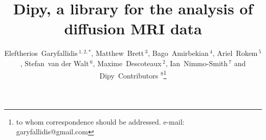 \documentclass{bioinfo}
\begin{document}

\title[DIPY]{Dipy, a library for the analysis of diffusion MRI data}

\author[Garyfallidis, Brett, Amirbekian, Rokem, van der Walt, Descoteaux,
  Nimmo-Smith]{Eleftherios~Garyfallidis\,$^{1,2,*}$, Matthew~Brett\,$^{3}$,
  Bago~Amirbekian\,$^{4}$, Ariel~Rokem\,$^{5}$, Stefan~van der Walt\,$^{6}$,
  Maxime~Descoteaux\,$^{2}$, Ian~Nimmo-Smith\,$^{7}$ and Dipy~Contributors
  $^{8}$\footnote{to whom correspondence should be addressed. e-mail:
    garyfallidis@gmail.com}}

\address{\,$^{1}$University of Cambridge, Cambridge, UK\\
  \,$^{2}$University of Sherbrooke, Sherbrooke, CA\\
  \,$^{3}$University of California, Henry H. Wheeler, Jr. Brain Imaging Center, Berkeley, CA.\\
  \,$^{4}$University of California, San Francisco, CA, USA\\
  \,$^{5}$Stanford University, Stanford, CA, USA\\
  \,$^{6}$Stellenbosch University, Stellenbosch, South Africa\\
  \,$^{7}$MRC Cognition and Brain Sciences Unit, Cambridge, UK\\
  \,$^{8}$\texttt{http://dipy.org/developers.html}
  }
\history{}

\editor{}

\maketitle
\end{document}
